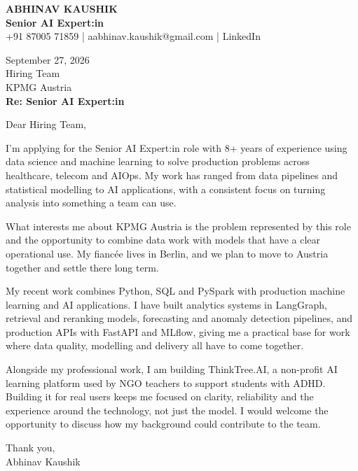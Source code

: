 \documentclass[10pt,a4paper]{article}
\begin{document}
\begin{center}
{\Large\bfseries ABHINAV KAUSHIK}\\[2pt]
{\bfseries Senior AI Expert:in}\\[2pt]
+91 87005 71859 \quad | \quad aabhinav.kaushik@gmail.com \quad | \quad LinkedIn
\end{center}
\vspace{8pt}
September 27, 2026\\[6pt]
Hiring Team\\
KPMG Austria\\[4pt]
\textbf{Re: Senior AI Expert:in}

Dear Hiring Team,

I’m applying for the Senior AI Expert:in role with 8+ years of experience using data science and machine learning to solve production problems across healthcare, telecom and AIOps. My work has ranged from data pipelines and statistical modelling to AI applications, with a consistent focus on turning analysis into something a team can use.

What interests me about KPMG Austria is the problem represented by this role and the opportunity to combine data work with models that have a clear operational use. My fiancée lives in Berlin, and we plan to move to Austria together and settle there long term.

My recent work combines Python, SQL and PySpark with production machine learning and AI applications. I have built analytics systems in LangGraph, retrieval and reranking models, forecasting and anomaly detection pipelines, and production APIs with FastAPI and MLflow, giving me a practical base for work where data quality, modelling and delivery all have to come together.

Alongside my professional work, I am building ThinkTree.AI, a non-profit AI learning platform used by NGO teachers to support students with ADHD. Building it for real users keeps me focused on clarity, reliability and the experience around the technology, not just the model. I would welcome the opportunity to discuss how my background could contribute to the team.

Thank you,\\
Abhinav Kaushik
\end{document}
